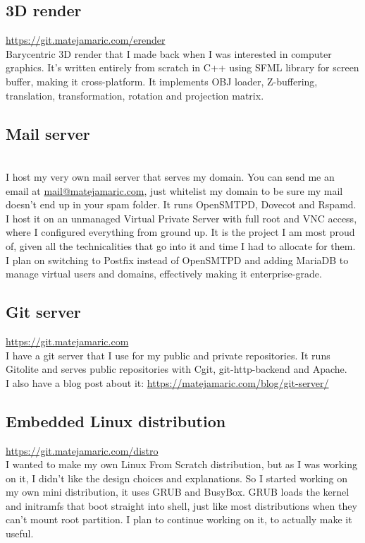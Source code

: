 \documentclass[12pt]{article}
\begin{document}
\subsection{3D render}
\hfill\url{https://git.matejamaric.com/erender}\\
Barycentric 3D render that I made back when I was interested in computer graphics. 
It's written entirely from scratch in C++ using SFML library for screen buffer, making it cross-platform.
It implements OBJ loader, Z-buffering, translation, transformation, rotation and projection matrix.
\\
\subsection{Mail server}
\hfill\\%
I host my very own mail server that serves my domain.
You can send me an email at \url{mail@matejamaric.com},
just whitelist my domain to be sure my mail doesn't end up in your spam folder.
It runs OpenSMTPD, Dovecot and Rspamd.
I host it on an unmanaged Virtual Private Server with full root and VNC access, where I configured everything from ground up.
It is the project I am most proud of, given all the technicalities that go into it and time I had to allocate for them.
I plan on switching to Postfix instead of OpenSMTPD and adding MariaDB to manage virtual users and domains, effectively making it enterprise-grade.
\\

\pagebreak

\subsection{Git server}
\hfill\url{https://git.matejamaric.com}\\
I have a git server that I use for my public and private repositories. It runs Gitolite and serves public repositories with Cgit, 
git-http-backend and Apache.\\
I also have a blog post about it: \url{https://matejamaric.com/blog/git-server/}
\\
\subsection{Embedded Linux distribution}
\hfill\url{https://git.matejamaric.com/distro}\\
I wanted to make my own Linux From Scratch distribution, but as I was working on it, I didn't like the design choices and explanations.
So I started working on my own mini distribution, it uses GRUB and BusyBox. 
GRUB loads the kernel and initramfs that boot straight into shell, just like most distributions when they can't mount root partition.
I plan to continue working on it, to actually make it useful. 
\\
\end{document}
